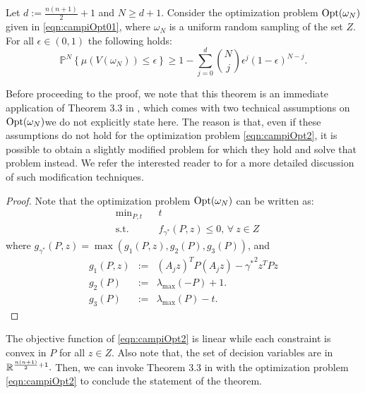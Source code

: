\begin{theorem}\label{mainTheorem0}
Let $d:=\frac{n(n+1)}{2}+1$ and $N \geq d+1$. Consider the optimization problem $\text{Opt}(\omega_N)$ given in \eqref{eqn:campiOpt01}, where $\omega_N$ is a uniform random sampling of the set $Z$.
For all $\epsilon \in (0,1)$ the following holds:
\begin{equation}\label{eqn:violation}\mathbb{P}^N\left\{ \mu(V(\omega_N)) \leq \epsilon \right\} \geq 1- \sum_{j=0}^{d} \binom{N}{j}\epsilon^j (1-\epsilon)^{N-j}.\end{equation}
\end{theorem}

Before proceeding to the proof, we note that this theorem is an immediate application of Theorem 3.3 in \cite{campi}, which comes with two technical assumptions on $\text{Opt}(\omega_N)$we do not explicitly state here. The reason is that, even if these assumptions do not hold for the optimization problem \ref{eqn:campiOpt2}, it is possible to obtain a slightly modified problem for which they hold and solve that problem instead. We refer the interested reader to \cite{campi} for a more detailed discussion of such modification techniques.

\begin{proof}Note that the optimization problem $\text{Opt}(\omega_N)$
can be written as:
\begin{equation}
\label{eqn:campiOpt2}
\begin{aligned}
& \text{min}_{P, t} & & t \\
& \text{s.t.} 
& & f_{\gamma^*}(P, z) \leq 0,\,\forall\ z \in Z\end{aligned}
\end{equation}
where $g_{\gamma^*}(P,z) = \max(g_1(P, z), g_2(P), g_3(P))$, and 
\begin{eqnarray*}
g_1(P, z) &:=& (A_j z)^TP(A_j z) - {\gamma^*}^2 z^TPz \\
g_2(P) &:=& \lambda_{\max}(-P) +1. \\
g_3(P) &:=&  \lambda_{\max}(P) - t.
\end{eqnarray*}
\end{proof}
The objective function of \eqref{eqn:campiOpt2} is linear while each constraint is convex in $P$ for all $z \in Z$. Also note that, the set of decision variables are in $\mathbb{R}^{\frac{n(n+1)}{2}+1}.$  Then, we can invoke Theorem 3.3 in \cite{campi} with the optimization problem \eqref{eqn:campiOpt2} to conclude the statement of the theorem.

